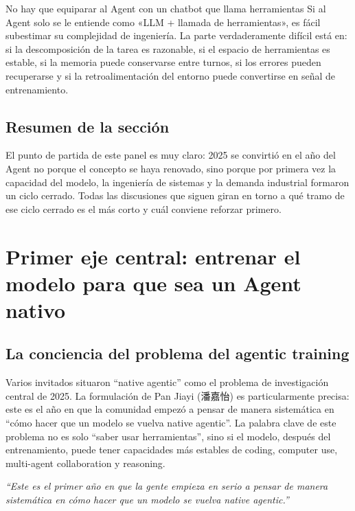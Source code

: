 \documentclass[a4paper]{article}
\begin{document}
\begin{warningbox}{No hay que equiparar al Agent con un chatbot que llama herramientas}
Si al Agent solo se le entiende como «LLM + llamada de herramientas», es fácil subestimar su complejidad de ingeniería. La parte verdaderamente difícil está en: si la descomposición de la tarea es razonable, si el espacio de herramientas es estable, si la memoria puede conservarse entre turnos, si los errores pueden recuperarse y si la retroalimentación del entorno puede convertirse en señal de entrenamiento.
\end{warningbox}

\subsection{Resumen de la sección}
El punto de partida de este panel es muy claro: 2025 se convirtió en el año del Agent no porque el concepto se haya renovado, sino porque por primera vez la capacidad del modelo, la ingeniería de sistemas y la demanda industrial formaron un ciclo cerrado. Todas las discusiones que siguen giran en torno a qué tramo de ese ciclo cerrado es el más corto y cuál conviene reforzar primero.
\section{Primer eje central: entrenar el modelo para que sea un Agent nativo}

\subsection{La conciencia del problema del agentic training}

Varios invitados situaron ``native agentic'' como el problema de investigación central de 2025. La formulación de Pan Jiayi (潘嘉怡) es particularmente precisa: este es el año en que la comunidad empezó a pensar de manera sistemática en ``cómo hacer que un modelo se vuelva native agentic''. La palabra clave de este problema no es solo ``saber usar herramientas'', sino si el modelo, después del entrenamiento, puede tener capacidades más estables de coding, computer use, multi-agent collaboration y reasoning.

\textit{``Este es el primer año en que la gente empieza en serio a pensar de manera sistemática en cómo hacer que un modelo se vuelva native agentic.''}
\end{document}
